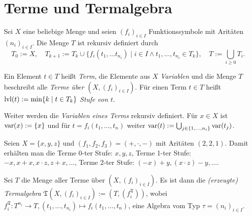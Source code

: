 \section{Terme und Termalgebra}

\begin{definition}
    Sei $X$ eine beliebige Menge und seien $(f_i)_{i \in I}$ Funktionssymbole mit Aritäten $(n_i)_{i \in I}$. Die Menge $T$ ist rekursiv definiert durch $$T_0 := X ,\quad T_{k+1} := T_k \cup \{f_i(t_1, \ldots t_{n_i}) \;\vert\; i \in I \land t_1, \ldots, t_{n_i} \in T_k\},\quad T := \bigcup_{i \ge 0} T_i.$$ 
    
    Ein Element $t \in T$ heißt \emph{Term}, die Elemente aus $X$ \emph{Variablen} und die Menge $T$ beschreibt alle \emph{Terme über $(X, (f_i)_{i \in I})$}.
    Für einen Term $t \in T$ heißt $\operatorname{lvl}(t) := \min\{k \;\vert\; t \in T_k\}$ \emph{Stufe von $t$}. 
    
    Weiter werden die \emph{Variablen eines Terms} rekursiv definiert. Für $x \in X$ ist $\operatorname{var}(x) := \{x\}$ und für $t = f_i(t_1, \ldots, t_n)$ weiter $\operatorname{var}(t) := \bigcup_{j \in \{1, \ldots, n_i\}} \operatorname{var}(t_j)$.
\end{definition}

\begin{example}
    Seien $X = \{x,y,z\}$ und $(f_1, f_2, f_3) = (+, \cdot, -)$ mit Aritäten $(2,2,1)$. Damit erhälten man die Terme 0-ter Stufe: $x, y, z$, Terme 1-ter Stufe: $-x, x+x, x\cdot z, z + x, \ldots$, Terme 2-ter Stufe: $(-x) + y, (x \cdot z) - y, \ldots$.
\end{example}

\begin{definition}
    Sei $T$ die Menge aller Terme über $(X, (f_i)_{i \in I})$. Es ist dann die \emph{(erzeugte) Termalgebra} $\mathfrak{T}(X, (f_i)_{i \in I}) := (T, (f_i^\mathfrak{T}))$, wobei $f_i^\mathfrak{T}: T^{n_i} \to T, (t_1, \ldots, t_{n_i}) \mapsto f_i(t_1, \ldots, t_n)$, eine Algebra vom Typ $\tau = (n_i)_{i \in I}$.
\end{definition}

